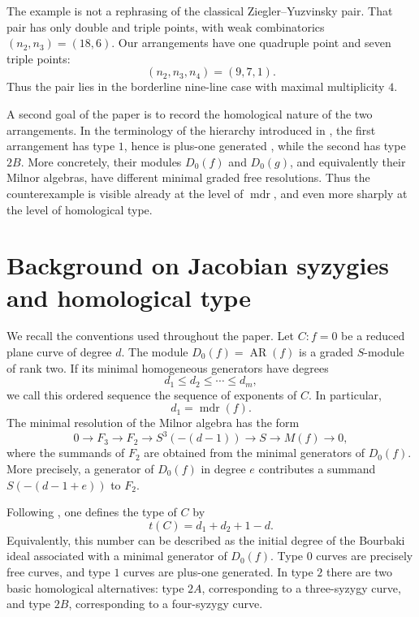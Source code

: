 \documentclass[11pt]{amsart}
\newcommand{\AR}{\operatorname{AR}}
\newcommand{\mdr}{\operatorname{mdr}}
\theoremstyle{plain}
\theoremstyle{definition}
\numberwithin{equation}{section}
\begin{document}
The example is not a rephrasing of the classical Ziegler--Yuzvinsky pair.  That pair has only double and triple points, with weak combinatorics \((n_2,n_3)=(18,6)\).  Our arrangements have one quadruple point and seven triple points:
\[
(n_2,n_3,n_4)=(9,7,1).
\]
Thus the pair lies in the borderline nine-line case with maximal multiplicity \(4\).

A second goal of the paper is to record the homological nature of the two arrangements.  In the terminology of the hierarchy introduced in \cite{ADP}, the first arrangement has type \(1\), hence is plus-one generated \cite{AbePOG}, while the second has type \(2B\).  More concretely, their modules \(D_0(f)\) and \(D_0(g)\), and equivalently their Milnor algebras, have different minimal graded free resolutions.  Thus the counterexample is visible already at the level of \(\mdr\), and even more sharply at the level of homological type.

\section{Background on Jacobian syzygies and homological type}

We recall the conventions used throughout the paper.  Let \(C:f=0\) be a reduced plane curve of degree \(d\).  The module \(D_0(f)=\AR(f)\) is a graded \(S\)-module of rank two.  If its minimal homogeneous generators have degrees
\[
d_1\leq d_2\leq \cdots \leq d_m,
\]
we call this ordered sequence the sequence of exponents of \(C\).  In particular,
\[
d_1=\mdr(f).
\]
The minimal resolution of the Milnor algebra has the form
\begin{equation}\label{eq:Milnor-resolution-general}
0\longrightarrow F_3\longrightarrow F_2\longrightarrow S^3(-(d-1))\longrightarrow S\longrightarrow M(f)\longrightarrow 0,
\end{equation}
where the summands of \(F_2\) are obtained from the minimal generators of \(D_0(f)\).  More precisely, a generator of \(D_0(f)\) in degree \(e\) contributes a summand \(S(-(d-1+e))\) to \(F_2\).

Following \cite{ADP}, one defines the type of \(C\) by
\begin{equation}\label{eq:type-def}
t(C)=d_1+d_2+1-d.
\end{equation}
Equivalently, this number can be described as the initial degree of the Bourbaki ideal associated with a minimal generator of \(D_0(f)\).  Type \(0\) curves are precisely free curves, and type \(1\) curves are plus-one generated.  In type \(2\) there are two basic homological alternatives: type \(2A\), corresponding to a three-syzygy curve, and type \(2B\), corresponding to a four-syzygy curve.
\end{document}
